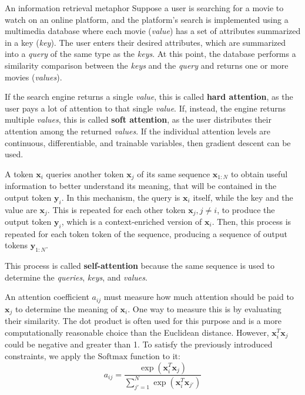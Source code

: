 \begin{note}{An information retrieval metaphor}
    Suppose a user is searching for a movie to watch on an online platform, and the platform's search is implemented using a multimedia database where each movie (\textit{value}) has a set of attributes summarized in a key (\textit{key}). The user enters their desired attributes, which are summarized into a \textit{query} of the same type as the \textit{keys}. At this point, the database performs a similarity comparison between the \textit{keys} and the \textit{query} and returns one or more movies (\textit{values}).

    If the search engine returns a single \textit{value}, this is called \textbf{hard attention}, as the user pays a lot of attention to that single \textit{value}. If, instead, the engine returns multiple \textit{values}, this is called \textbf{soft attention}, as the user distributes their attention among the returned \textit{values}. If the individual attention levels are continuous, differentiable, and trainable variables, then gradient descent can be used.

    A token \(\mathbf{x}_i\) queries another token \(\mathbf{x}_{j}\) of its same sequence \(\mathbf{x}_{1:N}\) to obtain useful information to better understand its meaning, that will be contained in the output token \(\mathbf{y}_i\).
    In this mechanism, the query is \(\mathbf{x}_i\) itself, while the key and the value are \(\mathbf{x}_j\).
    This is repeated for each other token \(\mathbf{x}_j,j\neq i\), to produce the output token \(\mathbf{y}_i\), which is a context-enriched version of \(\mathbf{x}_i\).
    Then, this process is repeated for each token token of the sequence, producing a sequence of output tokens \(\mathbf{y}_{1:N}\).

    This process is called \textbf{self-attention} because the same sequence is used to determine the \textit{queries}, \textit{keys}, and \textit{values}.
\end{note}

An attention coefficient $a_{ij}$ must measure how much attention should be paid to $\mathbf{x}_j$ to determine the meaning of $\mathbf{x}_{i}$. 
One way to measure this is by evaluating their similarity. 
The dot product is often used for this purpose and is a more computationally reasonable choice than the Euclidean distance. 
However, $\mathbf{x}_i^T \mathbf{x}_{j}$ could be negative and greater than 1. 
To satisfy the previously introduced constraints, we apply the $\text{Softmax}$ function to it:
\[
a_{ij}=\frac{\exp(\mathbf{x}_i^{T}\mathbf{x}_{j})}{\sum_{j'=1}^{N}\exp (\mathbf{x}_i^{T}\mathbf{x}_{j'})}
\]

